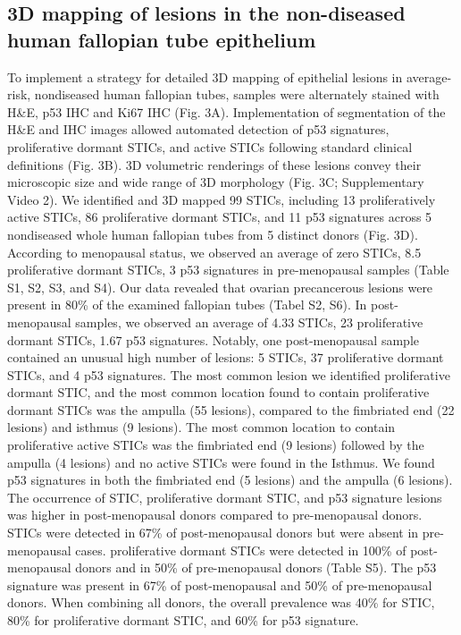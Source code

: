 \begin{refsection}
    \subsection{3D mapping of lesions in the non-diseased human fallopian tube epithelium}
    To implement a strategy for detailed 3D mapping of epithelial lesions in average-risk, nondiseased human fallopian tubes, samples were alternately stained with H\&E, p53 IHC and Ki67 IHC (Fig. 3A). Implementation of segmentation of the H\&E and IHC images allowed automated detection of p53 signatures, proliferative dormant STICs, and active STICs following standard clinical definitions (Fig. 3B). 3D volumetric renderings of these lesions convey their microscopic size and wide range  of 3D morphology (Fig. 3C; Supplementary Video 2). 
    We identified and 3D mapped 99 STICs, including 13 proliferatively active STICs, 86 proliferative dormant STICs, and 11 p53 signatures across 5 nondiseased whole human fallopian tubes from 5 distinct donors (Fig. 3D). According to menopausal status, we observed an average of zero STICs, 8.5 proliferative dormant STICs, 3 p53 signatures in pre-menopausal samples (Table S1, S2, S3, and S4). Our data revealed that ovarian precancerous lesions were present in 80\% of the examined fallopian tubes (Tabel S2, S6).  In post-menopausal samples, we observed an average of 4.33 STICs, 23 proliferative dormant STICs, 1.67 p53 signatures. Notably, one post-menopausal sample contained an unusual high number of lesions: 5 STICs, 37 proliferative dormant STICs, and 4 p53 signatures. The most common lesion we identified proliferative dormant STIC, and the most common location found to contain proliferative dormant STICs was the ampulla (55 lesions), compared to the fimbriated end (22 lesions) and isthmus (9 lesions). The most common location to contain proliferative active STICs was the fimbriated end (9 lesions) followed by the ampulla (4 lesions) and no active STICs were found in the Isthmus. We found p53 signatures in both the fimbriated end (5 lesions) and the ampulla (6 lesions).
    The occurrence of STIC, proliferative dormant STIC, and p53 signature lesions was higher in post-menopausal donors compared to pre-menopausal donors. STICs were detected in 67\% of post-menopausal donors but were absent in pre-menopausal cases. proliferative dormant STICs were detected in 100\% of post-menopausal donors and in 50\% of pre-menopausal donors (Table S5). The p53 signature was present in 67\% of post-menopausal and 50\% of pre-menopausal donors. When combining all donors, the overall prevalence was 40\% for STIC, 80\% for proliferative dormant STIC, and 60\% for p53 signature. 
    

\end{refsection}
